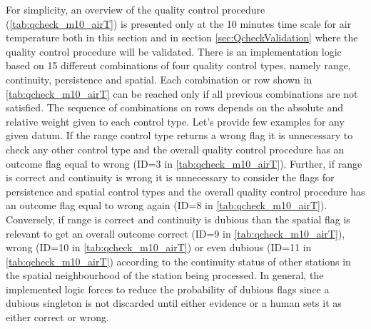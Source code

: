 \documentclass[authoryear,preprint,review,12pt]{elsarticle}
\newcommand{\note}[1]{\emph{\textcolor{red}{#1}}}
\begin{document}
For simplicity, an overview of the quality control procedure (\cref{tab:qcheck_m10_airT}) is presented only at the 10 minutes time scale for air temperature both in this section and in section \ref{sec:QcheckValidation} where the quality control procedure will be validated.
There is an implementation logic based on 15 different combinations of four quality control types, namely range, continuity, persistence and spatial.
Each combination or row shown in \cref{tab:qcheck_m10_airT} can be reached only if all previous combinations are not satisfied.
The sequence of combinations on rows depends on the absolute and relative weight given to each control type.
Let's provide few examples for any given datum.
If the range control type returns a wrong flag it is unnecessary to check any other control type and the overall quality control procedure has an outcome flag equal to wrong (ID=3 in \cref{tab:qcheck_m10_airT}).
Further, if range is correct and continuity is wrong it is unnecessary to consider the flags for persistence and spatial control types and the overall quality control procedure has an outcome flag equal to wrong again (ID=8 in \cref{tab:qcheck_m10_airT}).
Conversely, if range is correct and continuity is dubious than the spatial flag is relevant to get an overall outcome correct (ID=9 in \cref{tab:qcheck_m10_airT}), wrong (ID=10 in \cref{tab:qcheck_m10_airT}) or even dubious (ID=11 in \cref{tab:qcheck_m10_airT}) according to the continuity status of other stations in the spatial neighbourhood of the station being processed.
In general, the implemented logic forces to reduce the probability of dubious flags since a dubious singleton is not discarded until either evidence or a human sets it as either correct or wrong.

\end{document}
